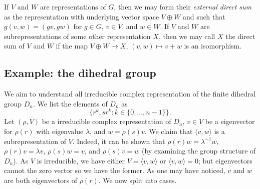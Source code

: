 If $V$ and $W$ are representations of $G$, then we may form their \emph{external direct sum} as the representation with underlying vector space $V \oplus W$ and such that $g(v, w) = (gv, gw)$ for $g \in G$, $v \in V$, and $w \in W$. If $V$ and $W$ are subrepresentations of some other representation $X$, then we may call $X$ the direct sum of $V$ and $W$ if the map $V \oplus W \to X$, $(v, w) \mapsto v + w$ is an isomorphism.

\subsection{Example: the dihedral group}

We aim to understand all irreducible complex representation of the finite dihedral group $D_n$. We list the elements of $D_n$ as
\[ \{r^k, sr^k: k \in \{0, \ldots, n-1\}\}. \]
Let $(\rho, V)$ be a irreducible complex representation of $D_n$, $v \in V$ be a eigenvector for $\rho(r)$ with eigenvalue $\lambda$, and $w = \rho(s)v$. We claim that $\langle v, w \rangle$ is a subrepresentation of $V$. Indeed, it can be shown that $\rho(r)w = \lambda^{-1}w$, $\rho(r)v = \lambda v$, $\rho(s)w = v$, and $\rho(s)v = w$ (by examining the group structure of $D_n$). As $V$ is irreducible, we have either $V = \langle v, w \rangle$ or $\langle v, w \rangle = 0$; but eigenvectors cannot the zero vector so we have the former. As one may have noticed, $v$ and $w$ are both eigenvectors of $\rho(r)$. We now split into cases.
